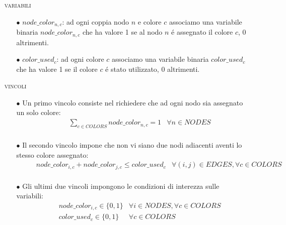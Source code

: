 \documentclass{article}
\begin{document}
\begin{itemize}
\item[] \textsc{variabili}
	\begin{itemize}
	\item[$\bullet$] $node\_color_{n,c}$: ad ogni coppia nodo $n$ e colore $c$ associamo una variabile binaria $node\_color_{n,c}$ che ha valore 1 se al nodo $n$ \'e assegnato il colore $c$, 0 altrimenti.\\
	\item[$\bullet$] $color\_used_{c}$: ad ogni colore $c$ associamo una variabile binaria $color\_used_{c}$ che ha valore 1 se il colore $c$ \'e stato utilizzato, 0 altrimenti.\\
	\end{itemize}
	
\item[] \textsc{vincoli}
	\begin{itemize}
	\item[$\bullet$] Un primo vincolo consiste nel richiedere che ad ogni nodo sia assegnato un solo colore:\\
	\begin{equation*}
	\begin{aligned}
	& & &  \sum\limits_{c \in COLORS} node\_color_{n,c} = 1 & \forall n \in NODES\\ 
	
	\end{aligned}
	\end{equation*}

	
	\item[$\bullet$] Il secondo vincolo impone che non vi siano due nodi adiacenti aventi lo stesso colore assegnato:\\
	\begin{equation*}
	\begin{aligned}
	& & &  node\_color_{i,c} + node\_color_{j,c} \le color\_used_{c} & \forall (i,j) \in EDGES, \forall c \in COLORS\\
		
	\end{aligned}
	\end{equation*}

	
	\item[$\bullet$] Gli ultimi due vincoli impongono le condizioni di interezza sulle variabili:\\
	\begin{equation*}
	\begin{aligned}
	& & &  node\_color_{i,c} \in \{0, 1\} & \forall i \in NODES, \forall c \in COLORS\\
	& & &  color\_used_{c} \in \{0, 1\} & \forall c \in COLORS\\
	

\end{aligned}
\end{equation*}
\end{itemize}
\end{itemize}
\end{document}
